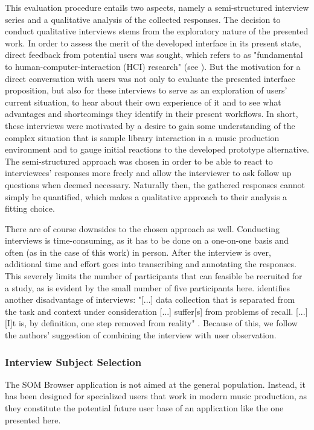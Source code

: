 This evaluation procedure entails two aspects, namely a semi-structured
interview series and a qualitative analysis of the collected responses. The
decision to conduct qualitative interviews stems from the exploratory nature of
the presented work. In order to assess the merit of the developed interface in
its present state, direct feedback from potential users was sought, which
\citet{lazar2017} refers to as "fundamental to human-computer-interaction (HCI)
research" (see \citet[p.187]{lazar2017}). But the motivation for a direct
conversation with users was not only to evaluate the presented interface
proposition, but also for these interviews to serve as an exploration of users'
current situation, to hear about their own experience of it and to see what
advantages and shortcomings they identify in their present workflows. In short,
these interviews were motivated by a desire to gain some understanding of the
complex situation that is sample library interaction in a music production
environment and to gauge initial reactions to the developed prototype
alternative. The semi-structured approach was chosen in order to be able to
react to interviewees' responses more freely and allow the interviewer to ask
follow up questions when deemed necessary. Naturally then, the gathered
responses cannot simply be quantified, which makes a qualitative approach to
their analysis a fitting choice.

\smallskip

There are of course downsides to the chosen approach as well. Conducting
interviews is time-consuming, as it has to be done on a one-on-one basis and
often (as in the case of this work) in person. After the interview is over,
additional time and effort goes into transcribing and annotating the responses.
This severely limits the number of participants that can feasible be recruited
for a study, as is evident by the small number of five participants here.
\citet{lazar2017} identifies another disadvantage of interviews: "[...] data
collection that is separated from the task and context under consideration [...]
suffer[s] from problems of recall. [...] [I]t is, by definition, one step
removed from reality" \citep[p.188ff.]{lazar2017}. Because of this, we follow
the authors' suggestion of combining the interview with user observation.

\bigskip


\subsubsection{Interview Subject Selection}
\label{subsubsec:subject_selection}
The SOM Browser application is not aimed at the general population. Instead, it
has been designed for specialized users that work in modern music production, as
they constitute the potential future user base of an application like the one
presented here.

